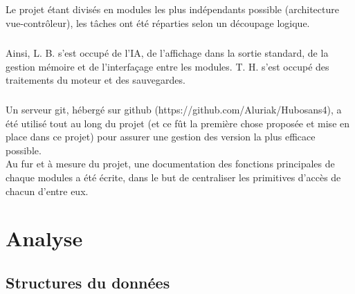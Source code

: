 \documentclass{report}
\begin{document}
    \paragraph*{}
    Le projet étant divisés en modules les plus indépendants possible (architecture vue-contrôleur), les tâches ont été réparties selon un découpage logique.
    \paragraph*{}
    Ainsi, L. B. s'est occupé de l'IA, de l'affichage dans la sortie standard, de la gestion mémoire et de l'interfaçage entre les modules. 
    T. H. s'est occupé des traitements du moteur et des sauvegardes.
    \paragraph*{}
    Un serveur git, hébergé sur github (https://github.com/Aluriak/Hubosans4), a été utilisé tout au long du projet (et ce fût la première chose proposée et mise en place dans ce projet) 
    pour assurer une gestion des version la plus efficace possible.\\
    Au fur et à mesure du projet, une documentation des fonctions principales de chaque modules a été écrite, dans le but de centraliser les primitives d'accès de chacun d'entre eux.


\chapter{Analyse}

    \section*{Structures du données}
\end{document}
